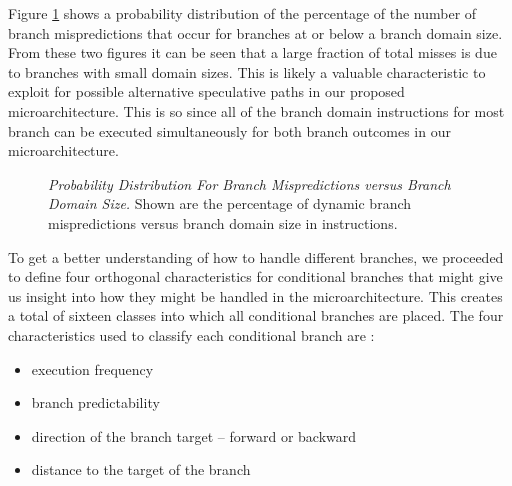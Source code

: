 \documentclass[10pt,dvips]{article}
\begin{document}
Figure \ref{fig:mispredictions} shows a probability distribution of
the percentage of the number of branch mispredictions that
occur for branches at or below a branch domain size.
From these two figures it can be seen 
that a large fraction of total misses is due to branches with small domain
sizes. 
This is likely a valuable characteristic to exploit for
possible alternative speculative paths in our proposed
microarchitecture.  This is so since all of the branch domain
instructions for most
branch can be executed simultaneously for both branch outcomes
in our microarchitecture.

\begin{figure}
\vspace{0.2 in}
\setlength{\epsfxsize}{10cm}%
\centerline{}
\caption{{\em Probability Distribution For Branch Mispredictions
versus Branch Domain Size.} 
Shown are the percentage of dynamic branch mispredictions versus 
branch domain size
in instructions.}
\label{fig:mispredictions}
\end{figure}

To get a better understanding of how to handle different branches,
we proceeded to define four orthogonal characteristics
for conditional branches that might give us insight into
how they might be handled in the microarchitecture.
This creates a total of sixteen classes into which all conditional 
branches are placed.
The four characteristics used to classify each conditional branch are :

\begin{itemize}
\item{execution frequency}
\item{branch predictability}
\item{direction of the branch target -- forward or backward}
\item{distance to the target of the branch}
\end{itemize}   
\end{document}
